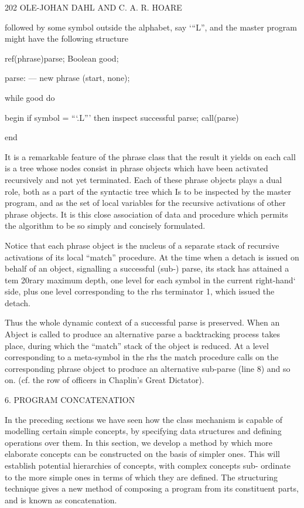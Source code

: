 {{{{{		202 OLE-JOHAN DAHL AND C. A. R. HOARE
		
		followed by some symbol outside the alphabet, say ‘“L”, and the master program might have the following structure
		
		ref(phrase)parse; Boolean good;
		
		parse: — new phrase (start, none);
		
		while good do
		
		begin if symbol = “‘.L”’ then inspect successful parse; call(parse)
		
		end
		
		It is a remarkable feature of the phrase class that the result it yields on each call is a tree whose nodes consist in phrase objects which have been activated recursively and not yet terminated. Each of these phrase objects plays a dual role, both as a part of the syntactic tree which Is to be inspected by the master program, and as the set of local variables for the recursive activations of other phrase objects. It is this close association of data and procedure which permits the algorithm to be so simply and concisely formulated.
		
		Notice that each phrase object is the nucleus of a separate stack of recursive activations of its local “match” procedure. At the time when a detach is issued on behalf of an object, signalling a successful (sub-) parse, its stack has attained a tem 20rary maximum depth, one level for each symbol in the current right-hand‘ side, plus one level corresponding to the rhs terminator 1, which issued the detach.
		
		Thus the whole dynamic context of a successful parse is preserved. When an Abject is called to produce an alternative parse a backtracking process takes place, during which the “match” stack of the object is reduced. At a level corresponding to a meta-symbol in the rhs the match procedure calls on the corresponding phrase object to produce an alternative sub-parse (line 8) and so on. (cf. the row of officers in Chaplin’s Great Dictator).
		
		6. PROGRAM CONCATENATION
		
		In the preceding sections we have seen how the class mechanism is capable of modelling certain simple concepts, by specifying data structures and defining operations over them. In this section, we develop a method by which more elaborate concepts can be constructed on the basis of simpler ones. This will establish potential hierarchies of concepts, with complex concepts sub- ordinate to the more simple ones in terms of which they are defined. The structuring technique gives a new method of composing a program from its constituent parts, and is known as concatenation.
		
}}}}}
